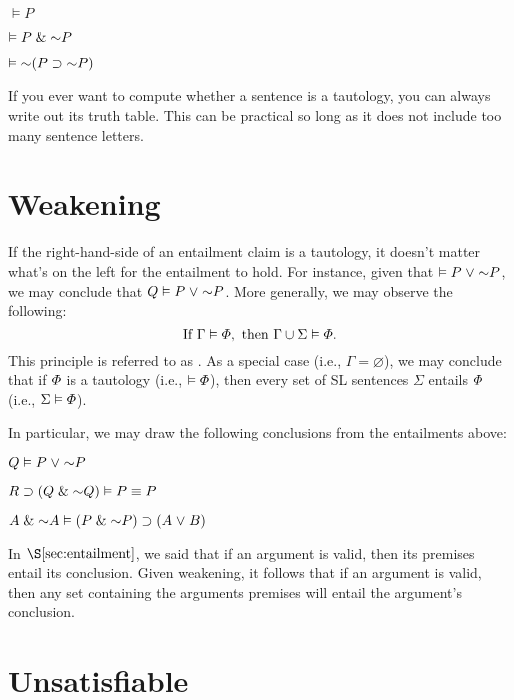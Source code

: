 \begin{earg}
  \item[] $\models P$
  \item[] $\models P \eand \enot P$
  \item[] $\models \enot(P \eif \enot P)$
\end{earg}

If you ever want to compute whether a sentence is a tautology, you can always write out its truth table.
This can be practical so long as it does not include too many sentence letters.


\section{Weakening}

If the right-hand-side of an entailment claim is a tautology, it doesn't matter what's on the left for the entailment to hold.
For instance, given that $\models P \eor \enot P$, we may conclude that $Q \models P \eor \enot P$.
More generally, we may observe the following:
$$\text{If}~ \Gamma \vDash \varPhi, ~\text{then}~ \Gamma \cup \Sigma\vDash \varPhi.$$
This principle is referred to as .
As a special case (i.e., $\Gamma=\varnothing$), we may conclude that if $\varPhi$ is a tautology (i.e., $\vDash \varPhi$), then every set of SL sentences $\Sigma$ entails $\varPhi$ (i.e., $\Sigma \vDash \varPhi$).

In particular, we may draw the following conclusions from the entailments above:

\begin{earg}
  \item[] $Q \models P \eor \enot P$
  \item[] $R \eif (Q \eand \enot Q)\models P \eiff P$
  \item[] $A \eand \enot A \models (P \eand\enot P)\eif (A \eor B)$
\end{earg}

In $\S\ref{sec:entailment}$, we said that if an argument is valid, then its premises entail its conclusion.
Given weakening, it follows that if an argument is valid, then any set containing the arguments premises will entail the argument's conclusion.




\section{Unsatisfiable}

